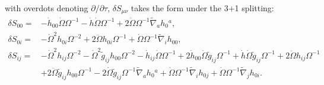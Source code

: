 \documentclass[10pt,letterpaper]{article}
\numberwithin{equation}{section}
\begin{document}
with overdots denoting $\partial/\partial \tau$, 
 $\delta S_{\mu\nu}$ takes the form under the 3+1 splitting:
\begin{align}
\delta S_{00}={}&- \dot{h}_{00} \dot{\Omega} \Omega^{-1}
 -  \dot{h} \dot{\Omega} \Omega^{-1}
 + 2 \dot{\Omega} \Omega^{-1} \tilde\nabla_{a}h_{0}{}^{a},
\\
\delta S_{0i}={}&- \dot{\Omega}^2 h_{0i} \Omega^{-2}
 + 2 \ddot{\Omega} h_{0i} \Omega^{-1}
 + \dot{\Omega} \Omega^{-1} \tilde\nabla_{i}h_{00},
\\
\delta S_{ij}={}&- \dot{\Omega}^2 h_{ij} \Omega^{-2}
 -  \dot{\Omega}^2 \tilde g_{ij} h_{00} \Omega^{-2}
 -  \dot{h}_{ij} \dot{\Omega} \Omega^{-1}
 + 2 \dot{h}_{00} \dot{\Omega} \tilde g_{ij} \Omega^{-1}
 + \dot{h} \dot{\Omega} \tilde g_{ij} \Omega^{-1}
 + 2 \ddot{\Omega} h_{ij} \Omega^{-1}\nonumber\\
& + 2 \ddot{\Omega} \tilde g_{ij} h_{00} \Omega^{-1}
 - 2 \dot{\Omega} \tilde g_{ij} \Omega^{-1} \tilde\nabla_{a}h_{0}{}^{a}
 + \dot{\Omega} \Omega^{-1} \tilde\nabla_{i}h_{0j}
 + \dot{\Omega} \Omega^{-1} \tilde\nabla_{j}h_{0i}.
\end{align}
\end{document}
